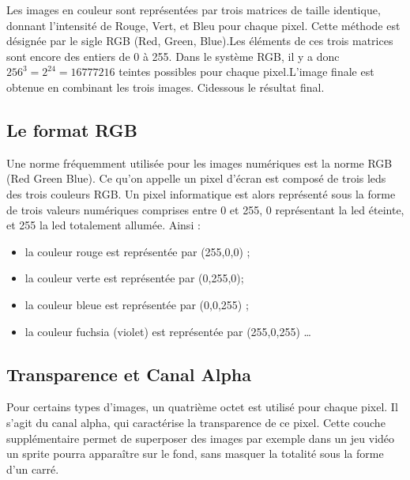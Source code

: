 \documentclass[letterpaper,10pt,english]{jupyterBook}
\begin{document}
\sphinxAtStartPar
Les images en couleur sont représentées par trois matrices de taille identique, donnant l’intensité de Rouge, Vert, et Bleu pour chaque pixel. Cette méthode est désignée par le sigle RGB (Red, Green, Blue).Les éléments de ces trois matrices sont encore des entiers de 0 à 255.
Dans le système RGB, il y a donc \(256^ 3 = 2^{24} = 16 777 216\) teintes possibles pour chaque pixel.L’image finale est obtenue en combinant les trois images. Ci\sphinxhyphen{}dessous le résultat final.


\subsection{Le format RGB}
\label{\detokenize{notebooks/images/TRAITEMENT-DES-IMAGES:le-format-rgb}}
\sphinxAtStartPar
Une norme fréquemment utilisée pour les images numériques est la norme RGB (Red Green Blue). Ce qu’on appelle un pixel d’écran est composé de trois leds des trois couleurs RGB. Un pixel informatique est alors représenté sous la forme de trois valeurs numériques comprises entre 0 et 255, 0 représentant la led éteinte, et 255 la led totalement allumée. Ainsi :
\begin{itemize}
\item {} 
\sphinxAtStartPar
la couleur rouge est représentée par (255,0,0) ;

\item {} 
\sphinxAtStartPar
la couleur verte est représentée par  (0,255,0);

\item {} 
\sphinxAtStartPar
la couleur bleue est représentée par (0,0,255) ;

\item {} 
\sphinxAtStartPar
la couleur fuchsia (violet) est représentée par (255,0,255) …

\end{itemize}

\sphinxAtStartPar
{}


\subsection{Transparence et Canal Alpha}
\label{\detokenize{notebooks/images/TRAITEMENT-DES-IMAGES:transparence-et-canal-alpha}}
\sphinxAtStartPar
Pour certains types d’images, un quatrième octet est utilisé pour chaque pixel. Il s’agit du canal alpha, qui caractérise la transparence de ce pixel. Cette couche supplémentaire permet de superposer des images \sphinxhyphen{} par exemple dans un jeu vidéo un sprite pourra apparaître sur le fond, sans masquer la totalité sous la forme d’un carré.
\end{document}
